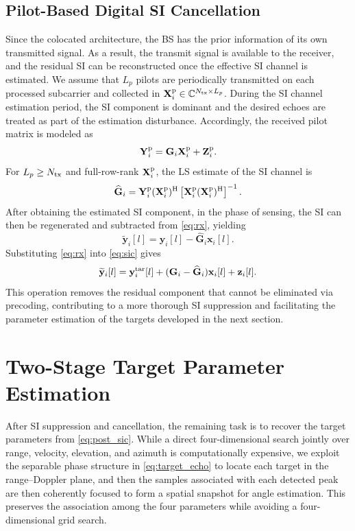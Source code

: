 \documentclass[conference]{IEEEtran}
\begin{document}
\subsection{Pilot-Based Digital SI Cancellation}\label{sec:sic}
Since the colocated architecture, the BS has the prior information of its own transmitted signal. As a result, the transmit signal is available to the receiver, and  the residual SI can be reconstructed once the effective SI channel is estimated. We assume that $L_p$ pilots are periodically transmitted on each processed subcarrier and collected in $\mathbf{X}_{i}^{\rm p}\in\mathbb{C}^{N_{\rm tx}\times L_p}$. During the SI channel estimation period, the SI component is dominant and the desired echoes are treated as part of the estimation disturbance. Accordingly, the received pilot matrix is modeled as
\begin{equation}
\mathbf{Y}_{i}^{\rm p}=\mathbf{G}_{i}\mathbf{X}_{i}^{\rm p}+\mathbf{Z}_{i}^{\rm p}.
\label{eq:sic_pilot}
\end{equation}
For $L_p\geq N_{\rm tx}$ and full-row-rank $\mathbf{X}_{i}^{\rm p}$, the LS estimate of the SI channel is
\begin{equation}
\widehat{\mathbf{G}}_{i}=\mathbf{Y}_{i}^{\rm p}(\mathbf{X}_{i}^{\rm p})^{\rm H}
\left[\mathbf{X}_{i}^{\rm p}(\mathbf{X}_{i}^{\rm p})^{\rm H}\right]^{-1}.
\label{eq:ls}
\end{equation}
After obtaining the estimated SI component,   in the phase of sensing, the SI can then be regenerated and subtracted from \eqref{eq:rx}, yielding
\begin{equation}
\widetilde{\mathbf{y}}_i[l]=\mathbf{y}_i[l]-\widehat{\mathbf{G}}_i\mathbf{x}_i[l].
\label{eq:sic}
\end{equation}
Substituting \eqref{eq:rx} into \eqref{eq:sic} gives
\begin{equation}
\widetilde{\mathbf{y}}_i[l]=\mathbf{y}_{i}^{\rm tar}[l]
+(\mathbf{G}_i-\widehat{\mathbf{G}}_i)\mathbf{x}_i[l]+\mathbf{z}_i[l].
\label{eq:post_sic}
\end{equation}
This operation removes the residual component that cannot be eliminated via precoding, contributing to a more thorough SI suppression and facilitating the parameter estimation of the targets developed in the next section.



\section{Two-Stage Target Parameter Estimation}\label{sec:estimation}
After SI suppression and cancellation, the remaining task is to recover the target parameters from \eqref{eq:post_sic}. While a direct four-dimensional search jointly over range, velocity, elevation, and azimuth is computationally expensive, we exploit the separable phase structure in \eqref{eq:target_echo} to locate each target in the range--Doppler plane, and then the samples associated with each detected peak are then coherently focused to form a spatial snapshot for angle estimation. This preserves the association among the four parameters while avoiding a four-dimensional grid search.
\end{document}
